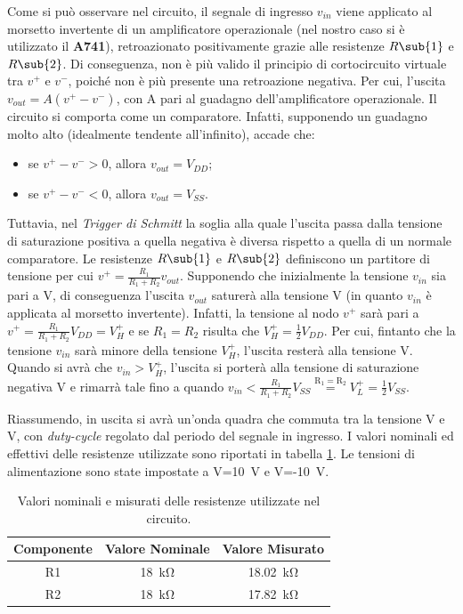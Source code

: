 \noindent
Come si può osservare nel circuito, il segnale di ingresso $v_{in}$ viene applicato al morsetto invertente di un amplificatore operazionale (nel nostro caso si è utilizzato il \textbf{\textmu A741}), retroazionato positivamente grazie alle resistenze $R\sub{1}$ e $R\sub{2}$. Di conseguenza, non è più valido il principio di cortocircuito virtuale tra $v^+$ e $v^-$, poiché non è più presente una retroazione negativa. Per cui, l'uscita $v_{out}=A(v^+-v^-)$, con A pari al guadagno dell'amplificatore operazionale. Il circuito si comporta come un comparatore. Infatti, supponendo un guadagno molto alto (idealmente tendente all'infinito), accade che:
\begin{itemize}
	\item se $v^+-v^->0$, allora $v_{out}=V_{DD}$;
	\item se $v^+-v^-<0$, allora $v_{out}=V_{SS}$.
\end{itemize}
Tuttavia, nel \textit{Trigger di Schmitt} la soglia alla quale l'uscita passa dalla tensione di saturazione positiva a quella negativa è diversa rispetto a quella di un normale comparatore. Le resistenze $R\sub{1}$ e $R\sub{2}$ definiscono un partitore di tensione per cui $v^+=\frac{R_1}{R_1+R_2}v_{out}$. Supponendo che inizialmente la tensione $v_{in}$ sia pari a V, di conseguenza l'uscita $v_{out}$ saturerà alla tensione V (in quanto $v_{in}$ è applicata al morsetto invertente). Infatti, la tensione al nodo $v^+$ sarà pari a $v^+=\frac{R_1}{R_1+R_2}V_{DD}=V_H^+$ e se $R_1=R_2$ risulta che $V_H^+=\frac{1}{2}V_{DD}$. Per cui, fintanto che la tensione $v_{in}$ sarà minore della tensione $V_H^+$, l'uscita resterà alla tensione V. Quando si avrà che $v_{in}>V_H^+$, l'uscita si porterà alla tensione di saturazione negativa V e rimarrà tale fino a quando $v_{in}<\frac{R_1}{R_1+R_2}V_{SS}\overset{\mathrm{R_1=R_2}}{=}V_L^+=\frac{1}{2}V_{SS}$. 

\noindent
Riassumendo, in uscita si avrà un'onda quadra che commuta tra la tensione V e V, con \textit{duty-cycle} regolato dal periodo del segnale in ingresso. I valori nominali ed effettivi delle resistenze utilizzate sono riportati in tabella \ref{tab:valori_componenti_2}. Le tensioni di alimentazione sono state impostate a V=\SI{10}{\volt} e V=-\SI{10}{\volt}.

\def\arraystretch{1.3}
\begin{table}[h]
	\centering
	\begin{tabular}{|c|c|c|}
		\hline
		Componente	& Valore Nominale & Valore Misurato \\ \hline
		R1 &\SI{18}{\kilo\ohm} & \SI{18,02}{\kilo\ohm} \\ \hline
		R2 &\SI{18}{\kilo\ohm} & \SI{17,82}{\kilo\ohm} \\ \hline
	\end{tabular}
	\caption{Valori nominali e misurati delle resistenze utilizzate nel circuito.}
	\label{tab:valori_componenti_2}
\end{table}

